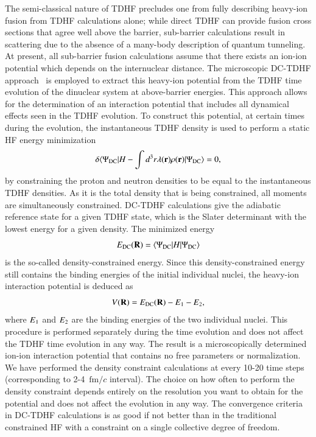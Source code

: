 The semi-classical nature of TDHF precludes one from fully describing heavy-ion fusion from TDHF calculations alone; while direct TDHF can provide fusion cross sections that agree well above the barrier, sub-barrier calculations result in scattering due to the absence of a many-body description of quantum tunneling.
At present, all sub-barrier fusion calculations assume that there exists an ion-ion potential which depends on the internuclear distance.
The microscopic DC-TDHF approach~\citep{umar2006b} is employed to extract this heavy-ion potential from the TDHF time evolution of the dinuclear system at above-barrier energies.
This approach allows for the determination of an interaction potential that includes all dynamical effects seen in the TDHF evolution.
To construct this potential, at certain times during the evolution, the instantaneous TDHF density is used to perform a static HF energy minimization
\begin{equation}
\delta \langle \Psi_{\rm DC}|H-\int d^3r \lambda(\textbf{r})\rho(\textbf{r})|\Psi_{\rm DC}\rangle=0,
\end{equation}
by constraining the proton and neutron densities to be equal to the instantaneous TDHF densities. As it is the total density that is being constrained, all moments are simultaneously constrained.
DC-TDHF calculations give the adiabatic reference state for a given TDHF state, which is the Slater determinant with the lowest energy for a given density.
The minimized energy
\begin{equation}
E_{\rm {DC}}(\textbf R)=\langle \Psi_{\rm DC}|H|\Psi_{\rm DC}\rangle
\end{equation}
is the so-called density-constrained energy.
Since this density-constrained energy still contains the binding energies of the initial individual nuclei, the heavy-ion interaction potential is deduced as
\begin{equation}
V(\textbf R)=E_{\rm {DC}}(\textbf R)-E_{\rm {1}}-E_{\rm {2}},
\end{equation}
where $E_{\rm {1}}$ and $E_{\rm {2}}$ are the binding energies of the two individual nuclei.
This procedure is performed separately during the time evolution and does not affect the TDHF time evolution in any way.
The result is a microscopically determined ion-ion interaction potential that contains no free parameters or normalization.
We have performed the density constraint calculations at every 10-20 time steps (corresponding to 2-4~$\mathrm {fm}/c$ interval).
The choice on how often to perform the density constraint depends entirely on the resolution you want to obtain for the potential and does not affect the evolution in any way.
The convergence criteria in DC-TDHF calculations is as good if not better than in the traditional constrained HF with a constraint on a single collective degree of freedom.

